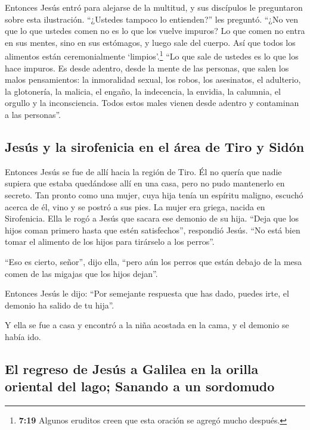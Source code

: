  Entonces Jesús entró para alejarse de la multitud, y sus
discípulos le preguntaron sobre esta ilustración. 
``¿Ustedes tampoco lo entienden?'' les preguntó. ``¿No ven que lo que
ustedes comen no es lo que los vuelve impuros?  Lo que
comen no entra en sus mentes, sino en sus estómagos, y luego sale del
cuerpo. Así que todos los alimentos están ceremonialmente
`limpios'.\footnote{\textbf{7:19} Algunos eruditos creen que esta
  oración se agregó mucho después.}  ``Lo que sale de
ustedes es lo que los hace impuros.  Es desde adentro,
desde la mente de las personas, que salen los malos pensamientos: la
inmoralidad sexual, los robos, los asesinatos, el adulterio,
 la glotonería, la malicia, el engaño, la indecencia, la
envidia, la calumnia, el orgullo y la inconsciencia. 
Todos estos males vienen desde adentro y contaminan a las personas''.

\hypertarget{jesuxfas-y-la-sirofenicia-en-el-uxe1rea-de-tiro-y-siduxf3n}{%
\subsection{Jesús y la sirofenicia en el área de Tiro y
Sidón}\label{jesuxfas-y-la-sirofenicia-en-el-uxe1rea-de-tiro-y-siduxf3n}}

 Entonces Jesús se fue de allí hacia la región de Tiro.
Él no quería que nadie supiera que estaba quedándose allí en una casa,
pero no pudo mantenerlo en secreto.  Tan pronto como una
mujer, cuya hija tenía un espíritu maligno, escuchó acerca de él, vino y
se postró a sus pies.  La mujer era griega, nacida en
Sirofenicia. Ella le rogó a Jesús que sacara ese demonio de su hija.
 ``Deja que los hijos coman primero hasta que estén
satisfechos'', respondió Jesús. ``No está bien tomar el alimento de los
hijos para tirárselo a los perros''.

 ``Eso es cierto, señor'', dijo ella, ``pero aún los
perros que están debajo de la mesa comen de las migajas que los hijos
dejan''.

 Entonces Jesús le dijo: ``Por semejante respuesta que
has dado, puedes irte, el demonio ha salido de tu hija''.

 Y ella se fue a casa y encontró a la niña acostada en la
cama, y el demonio se había ido.

\hypertarget{el-regreso-de-jesuxfas-a-galilea-en-la-orilla-oriental-del-lago-sanando-a-un-sordomudo}{%
\subsection{El regreso de Jesús a Galilea en la orilla oriental del
lago; Sanando a un
sordomudo}\label{el-regreso-de-jesuxfas-a-galilea-en-la-orilla-oriental-del-lago-sanando-a-un-sordomudo}}

